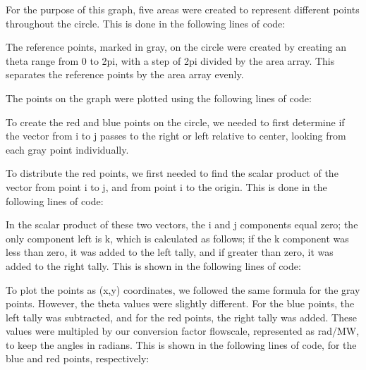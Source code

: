 \documentclass[12pt]{report}
\begin{document}
For the purpose of this graph, five areas were created to represent different
points throughout the circle. This is done in the following lines of code:
\singlespacing

\doublespacing

The reference points, marked in gray, on the circle were created by creating an theta range from
0 to 2pi, with a step of 2pi divided by the area array. This separates the reference
points by the area array evenly.

The points on the graph were plotted using the following lines of code:
\singlespacing

\doublespacing

To create the red and blue points on the circle, we needed to first determine if
the vector from i to j passes to the right or left relative to center, looking
from each gray point individually.

To distribute the red points, we first needed to find the scalar product of the
vector from point i to j, and from point i to the origin. This is done in the
following lines of code:

\singlespacing

\doublespacing

In the scalar product of these two vectors, the i and j components equal zero; the
only component left is k, which is calculated as follows; if the k component was
less than zero, it was added to the left tally, and if greater than zero, it was
added to the right tally. This is shown in the following lines of code:

\singlespacing

\doublespacing
\singlespacing

\doublespacing

To plot the points as (x,y) coordinates, we followed the same formula for the gray points.
However, the theta values were slightly different. For the blue points, the left tally
was subtracted, and for the red points, the right tally was added. These values were
multipled by our conversion factor flowscale, represented as rad/MW, to keep the angles
in radians. This is shown in the following lines of code, for the blue and red points, respectively:
\end{document}

